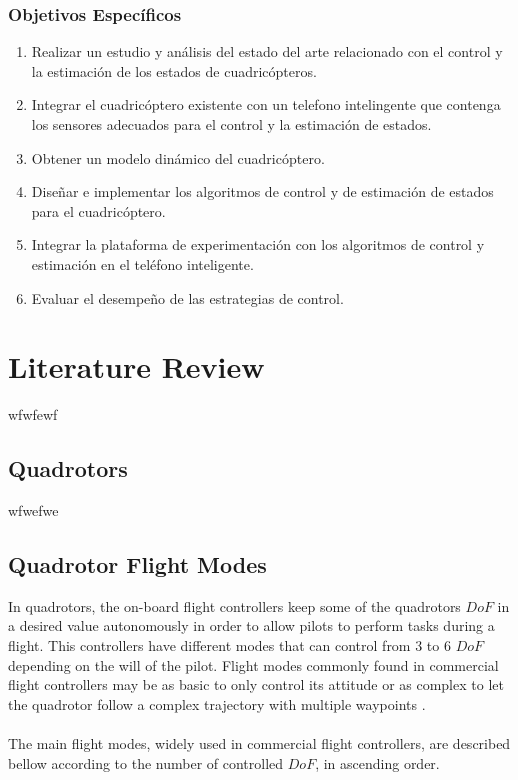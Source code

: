 \subsubsection{Objetivos Específicos}
\begin{enumerate}
\item Realizar un estudio y análisis del estado del arte relacionado con el control y la estimación de los estados de cuadricópteros.
\item Integrar el cuadricóptero existente con un telefono intelingente que contenga los sensores adecuados para el control y la estimación de estados.
\item Obtener un modelo dinámico del cuadricóptero.
\item Diseñar e implementar los algoritmos de control y de estimación de estados para el cuadricóptero.
\item Integrar la plataforma de experimentación con los algoritmos de control y estimación en el teléfono inteligente.
\item Evaluar el desempeño de las estrategias de control.%
\end{enumerate}

\section{Literature Review}
wfwfewf

\subsection{Quadrotors}
wfwefwe


\subsection{Quadrotor Flight Modes}
In quadrotors, the on-board flight controllers keep some of the quadrotors $DoF$ in a desired value autonomously in order to allow pilots to perform tasks during a flight. This controllers have different modes that can control from $3$ to $6$ $DoF$ depending on the will of the pilot. Flight modes commonly found in commercial flight controllers may be as basic to only control its attitude or as complex to let the quadrotor follow a complex trajectory with multiple waypoints \cite{Ardupilot2016}.
\\\\
The main flight modes, widely used in commercial flight controllers, are described bellow according to the number of controlled $DoF$, in ascending order.


